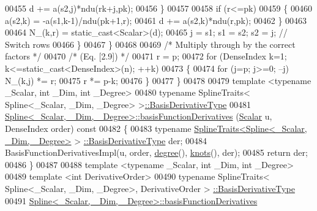 \begin{DoxyCode}
00455           d += a(s2,j)*ndu(rk+j,pk);
00456         \}
00457 
00458         \textcolor{keywordflow}{if} (r<=pk)
00459         \{
00460           a(s2,k) = -a(s1,k-1)/ndu(pk+1,r);
00461           d += a(s2,k)*ndu(r,pk);
00462         \}
00463 
00464         N\_(k,r) = \textcolor{keyword}{static\_cast<}Scalar\textcolor{keyword}{>}(d);
00465         j = s1; s1 = s2; s2 = j; \textcolor{comment}{// Switch rows}
00466       \}
00467     \}
00468 
00469     \textcolor{comment}{/* Multiply through by the correct factors */}
00470     \textcolor{comment}{/* (Eq. [2.9])                             */}
00471     r = p;
00472     \textcolor{keywordflow}{for} (DenseIndex k=1; k<=static\_cast<DenseIndex>(n); ++k)
00473     \{
00474       \textcolor{keywordflow}{for} (j=p; j>=0; --j) N\_(k,j) *= r;
00475       r *= p-k;
00476     \}
00477   \}
00478 
00479   \textcolor{keyword}{template} <\textcolor{keyword}{typename} \_Scalar, \textcolor{keywordtype}{int} \_Dim, \textcolor{keywordtype}{int} \_Degree>
00480   \textcolor{keyword}{typename} SplineTraits< Spline<\_Scalar, \_Dim, \_Degree> >\hyperlink{group___splines___module_a9db0b0108353660cd03524f2e67d6b3c}{::BasisDerivativeType}
00481     \hyperlink{group___splines___module_a17d416e814d1ee957e5b309dc423751f}{Spline<\_Scalar, \_Dim, \_Degree>::basisFunctionDerivatives}
      (\hyperlink{group___splines___module_a8cafd78b564825c76fbb3419653d9742}{Scalar} u, DenseIndex order)\textcolor{keyword}{ const}
00482 \textcolor{keyword}{  }\{
00483     \textcolor{keyword}{typename} \hyperlink{struct_eigen_1_1_spline_traits}{SplineTraits<Spline<\_Scalar, \_Dim, \_Degree>} >
      \hyperlink{group___splines___module_a9db0b0108353660cd03524f2e67d6b3c}{::BasisDerivativeType} der;
00484     BasisFunctionDerivativesImpl(u, order, \hyperlink{group___splines___module_a0df23e941ac0f31dcd095a4dd4f4a7ec}{degree}(), \hyperlink{group___splines___module_ae3eac8af580ad880d8ad3a259d453aa1}{knots}(), der);
00485     \textcolor{keywordflow}{return} der;
00486   \}
00487 
00488   \textcolor{keyword}{template} <\textcolor{keyword}{typename} \_Scalar, \textcolor{keywordtype}{int} \_Dim, \textcolor{keywordtype}{int} \_Degree>
00489   \textcolor{keyword}{template} <\textcolor{keywordtype}{int} DerivativeOrder>
00490   \textcolor{keyword}{typename} SplineTraits< Spline<\_Scalar, \_Dim, \_Degree>, DerivativeOrder >
      \hyperlink{group___splines___module_a9db0b0108353660cd03524f2e67d6b3c}{::BasisDerivativeType}
00491     \hyperlink{group___splines___module_a17d416e814d1ee957e5b309dc423751f}{Spline<\_Scalar, \_Dim, \_Degree>::basisFunctionDerivatives}

\end{DoxyCode}
